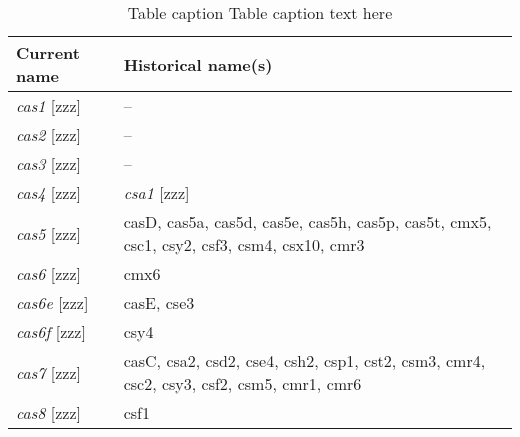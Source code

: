 \begin{table}
\caption{{Table caption} Table caption text here}
\centering
\begin{small}
\begin{tabular}{ll}

\toprule

\textbf{Current name}  & \textbf{Historical name(s)} \\
\midrule
\emph{cas1} [zzz] & -- \\
\emph{cas2} [zzz] & -- \\
\emph{cas3} [zzz] & -- \\
\emph{cas4} [zzz] & \emph{csa1} [zzz] \\
\emph{cas5} [zzz] & casD, cas5a, cas5d, cas5e, cas5h, cas5p, cas5t, cmx5, csc1, csy2, csf3, csm4, csx10, cmr3 \\
\emph{cas6} [zzz] & cmx6 \\
\emph{cas6e} [zzz] & casE, cse3 \\
\emph{cas6f} [zzz] & csy4 \\
\emph{cas7} [zzz] & casC, csa2, csd2, cse4, csh2, csp1, cst2, csm3, cmr4, csc2, csy3, csf2, csm5, cmr1, cmr6 \\
\emph{cas8} [zzz] & csf1 \\

\bottomrule
\end{tabular}
\end{small}
\label{tab:1}
\end{table}

